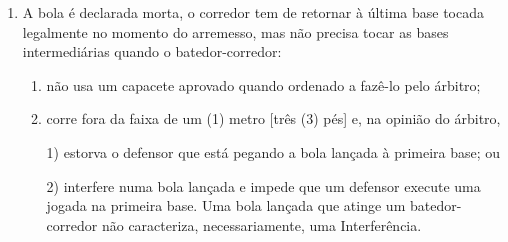 \begin{enumerate}[label=(\alph*)]
		\item  A bola é declarada morta, o corredor tem de retornar à última base tocada legalmente no momento do arremesso, mas não precisa tocar as bases intermediárias quando o batedor-corredor:
		\begin{enumerate}[label=\roman*.]
	\item  não usa um capacete aprovado quando ordenado a fazê-lo pelo árbitro;
	\item  corre fora da faixa de um (1) metro [três (3) pés] e, na opinião do árbitro,

 1) estorva o defensor que está pegando a bola lançada à primeira base;
 ou

 2) interfere numa bola lançada e impede que um defensor execute uma  jogada na primeira base. Uma bola lançada que atinge um batedor- corredor não caracteriza, necessariamente, uma Interferência.


\end{enumerate}
\end{enumerate}
